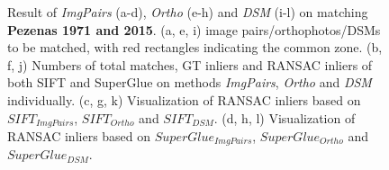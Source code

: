 \begin{figure}[htbp]
\begin{center}
{\begin{minipage}[t]{0.48\linewidth}
            \end{minipage}%
        }
        \caption{{\scriptsize Result of \textit{ImgPairs} (a-d), \textit{Ortho} (e-h) and \textit{DSM} (i-l) on matching \textbf{Pezenas 1971 and 2015}. (a, e, i) image pairs/orthophotos/DSMs to be matched, with red rectangles indicating the common zone. (b, f, j) Numbers of total matches, GT inliers and RANSAC inliers of both SIFT and SuperGlue on methods \textit{ImgPairs}, \textit{Ortho} and \textit{DSM} individually. (c, g, k) Visualization of RANSAC inliers based on $SIFT_{ImgPairs}$, $SIFT_{Ortho}$ and $SIFT_{DSM}$. (d, h, l) Visualization of RANSAC inliers based on $SuperGlue_{ImgPairs}$, $SuperGlue_{Ortho}$ and $SuperGlue_{DSM}$.}}        
        \label{MatchVizPezenas1971DSM}
    \end{center}
\end{figure} 



